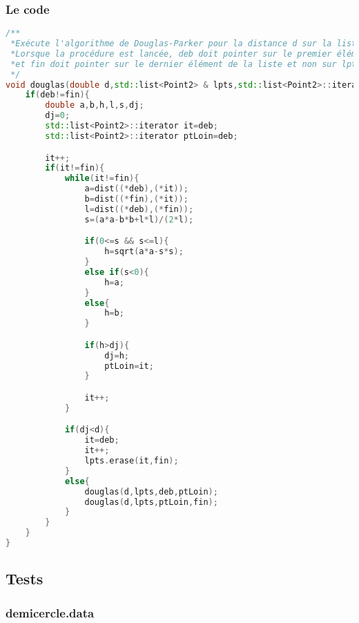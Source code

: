 \documentclass[11pt,a4paper]{article}
\begin{document}
   \subsubsection{Le code}
\begin{lstlisting}[language=c++]
 /**                                                                                                                                           
 *Exécute l'algorithme de Douglas-Parker pour la distance d sur la liste de points lpts.                                                      
 *Lorsque la procédure est lancée, deb doit pointer sur le premier élément de la liste,                                                       
 *et fin doit pointer sur le dernier élément de la liste et non sur lpts.end().                                                               
 */
void douglas(double d,std::list<Point2> & lpts,std::list<Point2>::iterator deb,std::list<Point2>::iterator fin){
    if(deb!=fin){
        double a,b,h,l,s,dj;
        dj=0;
        std::list<Point2>::iterator it=deb;
        std::list<Point2>::iterator ptLoin=deb;

        it++;
        if(it!=fin){
            while(it!=fin){
                a=dist((*deb),(*it));
                b=dist((*fin),(*it));
                l=dist((*deb),(*fin));
                s=(a*a-b*b+l*l)/(2*l);

                if(0<=s && s<=l){
                    h=sqrt(a*a-s*s);
                }
                else if(s<0){
                    h=a;
                }
                else{
                    h=b;
                }

                if(h>dj){
                    dj=h;
                    ptLoin=it;
                }

                it++;
            }

            if(dj<d){
                it=deb;
                it++;
                lpts.erase(it,fin);
            }
            else{
                douglas(d,lpts,deb,ptLoin);
                douglas(d,lpts,ptLoin,fin);
            }
        }
    }
}
\end{lstlisting}


\subsection{Tests}
\subsubsection{demicercle.data}
\end{document}
